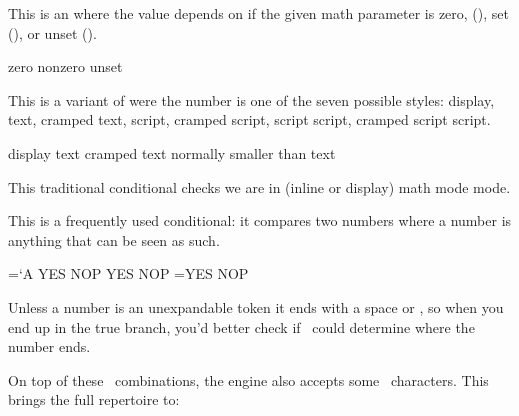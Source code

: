 This is an  where the value depends on if the given math parameter
is zero, (), set (), or unset ().

\starttyping
\ifmathparameter\Umathpunctclosespacing\displaystyle
    zero    \or
    nonzero \or
    unset   \fi
\stoptyping

\stopnewprimitive

\startnewprimitive[title={\prm {ifmathstyle}}]

This is a variant of  were the number is one of the seven possible
styles: display, text, cramped text, script, cramped script, script script,
cramped script script.

\starttyping
\ifmathstyle
  display
\or
  text
\or
  cramped text
\else
  normally smaller than text
\fi
\stoptyping

\stopnewprimitive

\startoldprimitive[title={\prm {ifmmode}}]

This traditional conditional checks we are in (inline or display) math mode mode.

\stopoldprimitive

\startoldprimitive[title={\prm {ifnum}}]

This is a frequently used conditional: it compares two numbers where a number is
anything that can be seen as such.

\startbuffer
{} \chardef{}

=`A              YES \else NOP\fi
\ifnum{} YES \else NOP\fi
\ifnum\scratchcounter=\A YES \else NOP\fi
\stopbuffer

\typebuffer

Unless a number is an unexpandable token it ends with a space or ,
so when you end up in the true branch, you'd better check if \TEX\ could
determine where the number ends.

{\getbuffer}


On top of these \ASCII\ combinations, the engine also accepts some \UNICODE\
characters. This brings the full repertoire to:

